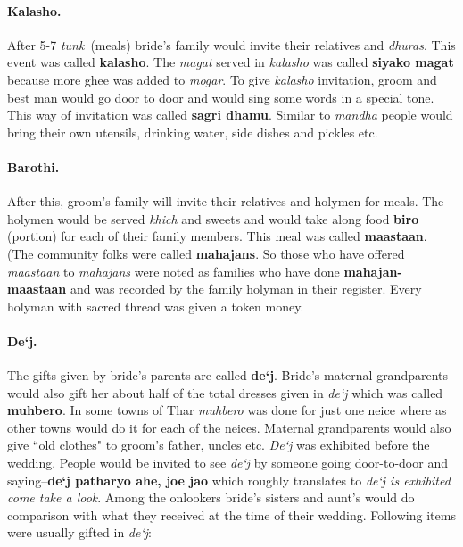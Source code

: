 \paragraph{Kalasho.} After 5-7 \textit{tunk}~(meals) bride's family would
invite their relatives and \textit{dhuras}. This event was called
\textbf{kalasho}. The \textit{magat} served in \textit{kalasho} was called
\textbf{siyako magat} because more ghee was added to \textit{mogar}. To give
\textit{kalasho} invitation, groom and best man would go door to door and would
sing some words in a special tone. This way of invitation was called
\textbf{sagri dhamu}. Similar to \textit{mandha} people would bring their own
utensils, drinking water, side dishes and pickles etc.

\paragraph{Barothi.} After this, groom's family will invite their relatives and
holymen for meals. The holymen would be served \textit{khich} and sweets and
would take along food \textbf{biro} (portion) for each of their family members.
This meal was called \textbf{maastaan}. (The community folks were called
\textbf{mahajans}. So those who have offered \textit{maastaan} to
\textit{mahajans} were noted as families who have done
\textbf{mahajan-maastaan} and was recorded by the family holyman in
their register. Every holyman with sacred thread was given a token
money.

\paragraph{De`j.} The gifts given by bride's parents are called \textbf{de`j}.
Bride's maternal grandparents would also gift her about half of the total
dresses given in \textit{de`j} which was called \textbf{muhbero}. In some towns
of Thar \textit{muhbero} was done for just one neice where as other towns would
do it for each of the neices. Maternal grandparents would also give ``old
clothes" to groom's father, uncles etc. \textit{De`j} was exhibited before the
wedding. People would be invited to see \textit{de`j} by someone going
door-to-door and saying--\textbf{de`j patharyo ahe, joe jao} which roughly
translates to \textit{de`j is exhibited come take a look}. Among the onlookers
bride's sisters and aunt's would do comparison with what they received at the
time of their wedding. Following items were usually gifted in \textit{de`j}:

